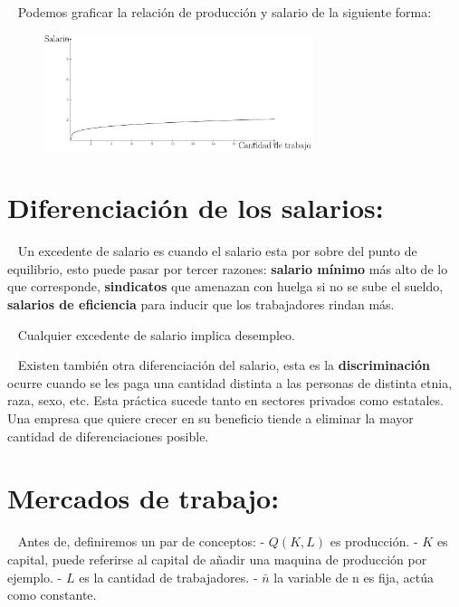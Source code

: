 \documentclass[
  letterpaper,
  DIV=11,
  numbers=noendperiod]{scrreport}
\begin{document}
~ Podemos graficar la relación de producción y salario de la siguiente
forma:

\begin{figure}

{\centering \includegraphics[width=0.7\textwidth,height=\textheight]{4sistimpo_files/figure-pdf/unnamed-chunk-4-1.pdf}

}

\end{figure}

\hypertarget{diferenciaciuxf3n-de-los-salarios}{%
\section{Diferenciación de los
salarios:}\label{diferenciaciuxf3n-de-los-salarios}}

~ Un excedente de salario es cuando el salario esta por sobre del punto
de equilibrio, esto puede pasar por tercer razones: \textbf{salario
mínimo} más alto de lo que corresponde, \textbf{sindicatos} que amenazan
con huelga si no se sube el sueldo, \textbf{salarios de eficiencia} para
inducir que los trabajadores rindan más.

~ Cualquier excedente de salario implica desempleo.

~ Existen también otra diferenciación del salario, esta es la
\textbf{discriminación} ocurre cuando se les paga una cantidad distinta
a las personas de distinta etnia, raza, sexo, etc. Esta práctica sucede
tanto en sectores privados como estatales. Una empresa que quiere crecer
en su beneficio tiende a eliminar la mayor cantidad de diferenciaciones
posible.

\hypertarget{mercados-de-trabajo}{%
\section{Mercados de trabajo:}\label{mercados-de-trabajo}}

~ Antes de, definiremos un par de conceptos: - \(Q(K,L)\) es producción.
- \(K\) es capital, puede referirse al capital de añadir una maquina de
producción por ejemplo. - \(L\) es la cantidad de trabajadores. -
\(\bar{n}\) la variable de n es fija, actúa como constante.
\end{document}

